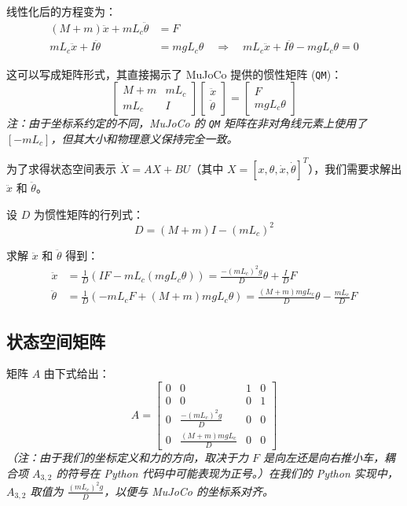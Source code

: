 \documentclass[a4paper,12pt]{article}
\begin{document}
线性化后的方程变为：
\begin{align}
    (M + m)\ddot{x} + m L_c \ddot{\theta} &= F \label{eq:lin1} \\
    m L_c \ddot{x} + I\ddot{\theta} &= m g L_c \theta \label{eq:lin2} \quad \Rightarrow \quad m L_c \ddot{x} + I\ddot{\theta} - m g L_c \theta = 0
\end{align}

这可以写成矩阵形式，其直接揭示了 MuJoCo 提供的惯性矩阵 (\texttt{QM})：
\begin{equation}
    \begin{bmatrix} M + m & m L_c \\ m L_c & I \end{bmatrix} \begin{bmatrix} \ddot{x} \\ \ddot{\theta} \end{bmatrix} = \begin{bmatrix} F \\ m g L_c \theta \end{bmatrix}
\end{equation}
\textit{注：由于坐标系约定的不同，MuJoCo 的 \texttt{QM} 矩阵在非对角线元素上使用了 $[-m L_c]$，但其大小和物理意义保持完全一致。}

为了求得状态空间表示 $\dot{X} = AX + BU$（其中 $X = [x, \theta, \dot{x}, \dot{\theta}]^T$），我们需要求解出 $\ddot{x}$ 和 $\ddot{\theta}$。

设 $D$ 为惯性矩阵的行列式：
\begin{equation}
    D = (M + m) I - (m L_c)^2
\end{equation}

求解 $\ddot{x}$ 和 $\ddot{\theta}$ 得到：
\begin{align}
    \ddot{x} &= \frac{1}{D} \left( I F - m L_c (m g L_c \theta) \right) = \frac{-(m L_c)^2 g}{D} \theta + \frac{I}{D} F \\
    \ddot{\theta} &= \frac{1}{D} \left( -m L_c F + (M + m) m g L_c \theta \right) = \frac{(M + m) m g L_c}{D} \theta - \frac{m L_c}{D} F
\end{align}

\subsection{状态空间矩阵}
矩阵 $A$ 由下式给出：
\begin{equation}
    A = \begin{bmatrix} 
    0 & 0 & 1 & 0 \\
    0 & 0 & 0 & 1 \\
    0 & \frac{-(m L_c)^2 g}{D} & 0 & 0 \\
    0 & \frac{(M + m) m g L_c}{D} & 0 & 0 
    \end{bmatrix}
\end{equation}
\textit{（注：由于我们的坐标定义和力的方向，取决于力 $F$ 是向左还是向右推小车，耦合项 $A_{3,2}$ 的符号在 Python 代码中可能表现为正号。）在我们的 Python 实现中，$A_{3,2}$ 取值为 $\frac{(m L_c)^2 g}{D}$，以便与 MuJoCo 的坐标系对齐。}
\end{document}
